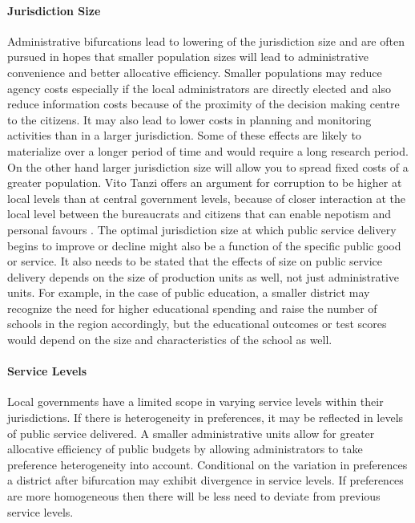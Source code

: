 \documentclass[12pt, a4paper]{article}
\begin{document}
\paragraph{Jurisdiction Size} Administrative bifurcations lead to lowering of the jurisdiction size and are often pursued in hopes that smaller population sizes will lead to administrative convenience and better allocative efficiency. Smaller populations may reduce agency costs especially if the local administrators are directly elected and also reduce information costs because of the proximity of the decision making centre to the citizens. It may also lead to lower costs in planning and monitoring activities than in a larger jurisdiction. Some of these effects are likely to materialize over a longer period of time and would require a long research period. On the other hand larger jurisdiction size will allow you to spread fixed costs of a greater population. Vito Tanzi offers an argument for corruption to be higher at local levels than at central government levels, because of closer interaction at the local level between the bureaucrats and citizens that can enable nepotism and personal favours \parencite{tanzi1996macroeconomic}. \nocite{allers2016effects} \nocite{lassen_jurisdiction_2011} The optimal jurisdiction size at which public service delivery begins to improve or decline might also be a function of the specific public good or service. It also needs to be stated that the effects of size on public service delivery depends on the size of production units as well, not just administrative units. For example, in the case of public education, a smaller district may recognize the need for higher educational spending and raise the number of schools in the region accordingly, but the educational outcomes or test scores would depend on the size and characteristics of the school as well. 

\paragraph{Service Levels} Local governments have a limited scope in varying service levels within their jurisdictions. If there is heterogeneity in preferences, it may be reflected in levels of public service delivered. A smaller administrative units allow for greater allocative efficiency of public budgets by allowing administrators to take preference heterogeneity into account. Conditional on the variation in preferences a district after bifurcation may exhibit divergence in service levels. If preferences are more homogeneous then there will be less need to deviate from previous service levels. 
\end{document}
